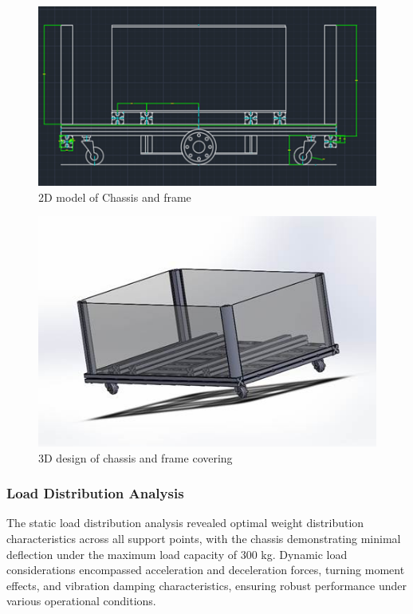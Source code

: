 \documentclass[../../main]{subfiles}
\begin{document}
\begin{figure}[h!]
\centering
\includegraphics[width=\textwidth]{img/image118.png}
\caption{2D model of Chassis and frame}
\end{figure}

\begin{figure}[h!]
  \centering
  \includegraphics[width=\textwidth]{img/image120.jpg}
  \caption{3D design of chassis and frame covering}
  \end{figure}

\subsubsection{Load Distribution
Analysis}\label{load-distribution-analysis}

The static load distribution analysis revealed optimal weight
distribution characteristics across all support points, with the chassis
demonstrating minimal deflection under the maximum load capacity of 300
kg. Dynamic load considerations encompassed acceleration and
deceleration forces, turning moment effects, and vibration damping
characteristics, ensuring robust performance under various operational
conditions.
\end{document}
